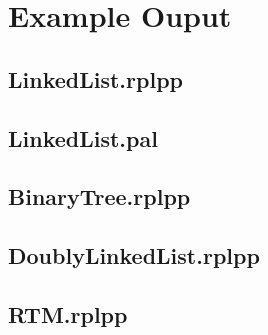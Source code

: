 \chapter{Example Ouput}
\label{app:example-output}

\section*{LinkedList.rplpp}


\newpage
\section*{LinkedList.pal}


\newpage
\section*{BinaryTree.rplpp}


% 

\newpage
\section*{DoublyLinkedList.rplpp}


%    

\newpage
\section*{RTM.rplpp}


%  
